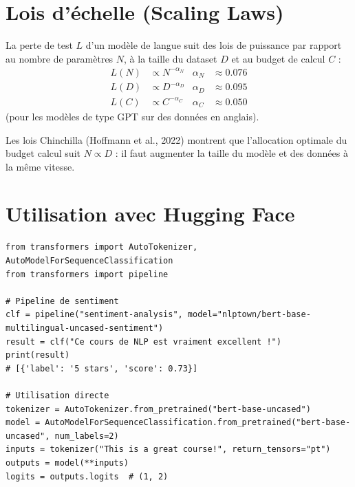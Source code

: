 \section{Lois d'\'echelle (Scaling Laws)}
\label{sec:pre:scaling}

\begin{theoreme}
La perte de test $L$ d'un mod\`ele de langue suit des lois de puissance par
rapport au nombre de param\`etres $N$, \`a la taille du dataset $D$ et au
budget de calcul $C$ :
\begin{align}
L(N) &\propto N^{-\alpha_N} & \alpha_N &\approx 0.076 \\
L(D) &\propto D^{-\alpha_D} & \alpha_D &\approx 0.095 \\
L(C) &\propto C^{-\alpha_C} & \alpha_C &\approx 0.050
\end{align}
(pour les mod\`eles de type GPT sur des donn\'ees en anglais).
\end{theoreme}

\begin{remarque}
Les lois Chinchilla (Hoffmann et al., 2022) montrent que l'allocation optimale
du budget calcul suit $N \propto D$ : il faut augmenter la taille du mod\`ele
et des donn\'ees \`a la m\^eme vitesse.
\end{remarque}

\section{Utilisation avec Hugging Face}
\label{sec:pre:hf}

\begin{codeblock}[title=\textbf{BERT pour la classification de texte}]
\begin{verbatim}
from transformers import AutoTokenizer, AutoModelForSequenceClassification
from transformers import pipeline

# Pipeline de sentiment
clf = pipeline("sentiment-analysis", model="nlptown/bert-base-multilingual-uncased-sentiment")
result = clf("Ce cours de NLP est vraiment excellent !")
print(result)
# [{'label': '5 stars', 'score': 0.73}]

# Utilisation directe
tokenizer = AutoTokenizer.from_pretrained("bert-base-uncased")
model = AutoModelForSequenceClassification.from_pretrained("bert-base-uncased", num_labels=2)
inputs = tokenizer("This is a great course!", return_tensors="pt")
outputs = model(**inputs)
logits = outputs.logits  # (1, 2)
\end{verbatim}
\end{codeblock}


